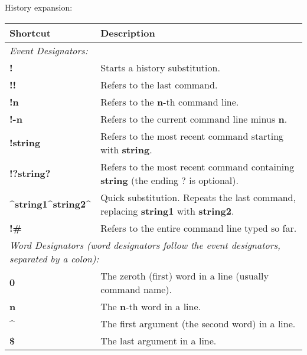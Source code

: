 \documentclass{article}
\begin{document}
\vfill



\newpage

\mbox{}

History expansion:

\begin{tabular}{|p{3.5cm}|p{14cm}|}
\hline
\large\textbf{Shortcut} & \large\textbf{Description} \\
\hline
\multicolumn{2}{|l|}{\small\it{Event Designators:}} \\
\hline
\textbf{!} & Starts a history substitution. \\
\hline
\textbf{!!} & Refers to the last command. \\
\hline
\textbf{!n} & Refers to the \textbf{n}-th command line. \\
\hline
\textbf{!-n} & Refers to the current command line minus \textbf{n}. \\
\hline
\textbf{!string} & Refers to the most recent command starting with \textbf{string}. \\
\hline
\textbf{!?string?} & Refers to the most recent command containing \textbf{string} (the ending ? is optional). \\
\hline
\textbf{\^{}string1\^{}string2\^{}} & Quick substitution. Repeats the last command, replacing \textbf{string1} with \textbf{string2}. \\
\hline
\textbf{!\#} & Refers to the entire command line typed so far. \\
\hline
\multicolumn{2}{|l|}{\small\it{Word Designators (word designators follow the event designators, separated by a colon):}} \\
\hline
\textbf{0} & The zeroth (first) word in a line (usually command name). \\
\hline
\textbf{n} & The \textbf{n}-th word in a line. \\
\hline
\textbf{\^{}} & The first argument (the second word) in a line. \\
\hline
\textbf{\$} & The last argument in a line. \\

\end{tabular}
\end{document}
